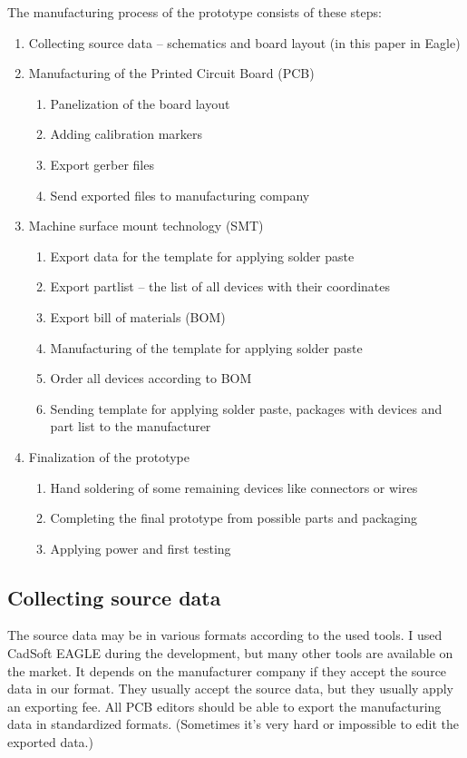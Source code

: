 The manufacturing process of the prototype consists of these steps:
\begin{enumerate}
    \item Collecting source data -- schematics and board layout (in this paper in Eagle)
    \item Manufacturing of the Printed Circuit Board (\ac{PCB})
    \begin{enumerate}
        \item Panelization of the board layout
        \item Adding calibration markers
        \item Export gerber files
        \item Send exported files to manufacturing company
    \end{enumerate}
    \item Machine surface mount technology (\ac{SMT})
    \begin{enumerate}
        \item Export data for the template for applying solder paste
        \item Export partlist -- the list of all devices with their coordinates
        \item Export bill of materials (\ac{BOM})
        \item Manufacturing of the template for applying solder paste
        \item Order all devices according to \ac{BOM}
        \item Sending template for applying solder paste, packages with devices and part list to the manufacturer
    \end{enumerate}
    \item Finalization of the prototype
    \begin{enumerate}
        \item Hand soldering of some remaining devices like connectors or wires
        \item Completing the final prototype from possible parts and packaging
        \item Applying power and first testing
    \end{enumerate}
\end{enumerate}

\subsection{Collecting source data}
The source data may be in various formats according to the used tools. I used CadSoft \ac{EAGLE} \cite{EAGLE} during the development, but many other tools are available on the market. It depends on the manufacturer company if they accept the source data in our format. They usually accept the source data, but they usually apply an exporting fee. All \ac{PCB} editors should be able to export the manufacturing data in standardized formats. (Sometimes it's very hard or impossible to edit the exported data.)

